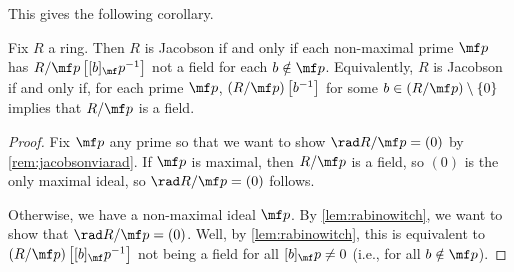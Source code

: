 This gives the following corollary.
\begin{corollary}[Rabinowitch] \label{cor:betterjacobson}
	Fix $R$ a ring. Then $R$ is Jacobson if and only if each non-maximal prime $\mf p$ has $R/\mf p\left[[b]_\mf p^{-1}\right]$ not a field for each $b\notin\mf p$. Equivalently, $R$ is Jacobson if and only if, for each prime $\mf p$, $(R/\mf p)\left[b^{-1}\right]$ for some $b\in(R/\mf p)\setminus\{0\}$ implies that $R/\mf p$ is a field.
\end{corollary}
\begin{proof}
	Fix $\mf p$ any prime so that we want to show $\rad R/\mf p=(0)$ by \autoref{rem:jacobsonviarad}. If $\mf p$ is maximal, then $R/\mf p$ is a field, so $(0)$ is the only maximal ideal, so $\rad R/\mf p=(0)$ follows.

	Otherwise, we have a non-maximal ideal $\mf p$. By \autoref{lem:rabinowitch}, we want to show that $\rad R/\mf p=(0)$. Well, by \autoref{lem:rabinowitch}, this is equivalent to $(R/\mf p)\left[[b]_\mf p^{-1}\right]$ not being a field for all $[b]_\mf p\ne0$ (i.e., for all $b\notin\mf p$).
\end{proof}

